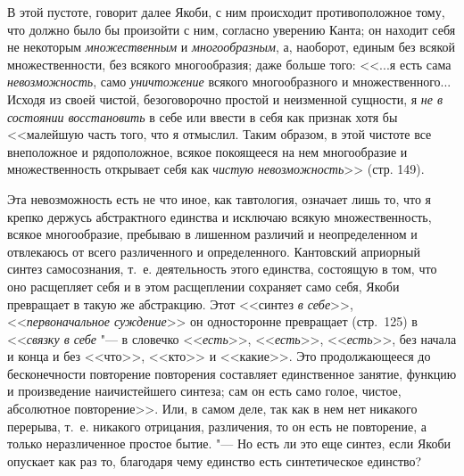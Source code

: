 В этой пустоте, говорит далее Якоби, с ним происходит противоположное тому,
что должно было бы произойти с ним, согласно уверению Канта; он находит
себя не некоторым {\em множественным} и
{\em многообразным}, а, наоборот, единым без всякой
множественности, без всякого многообразия; даже больше того: <<...я есть
сама {\em невозможность}, само
{\em уничтожение} всякого многообразного и
множественного... Исходя из своей чистой, безоговорочно простой и
неизменной сущности, я {\em не в состоянии
восстановить} в себе или ввести в себя как признак хотя бы <<малейшую часть
того, что я отмыслил. Таким образом, в этой чистоте все внеположное и
рядоположное, всякое покоящееся на нем многообразие и множественность
открывает себя как {\em чистую невозможность}>> (стр.
149).

Эта невозможность есть не что иное, как тавтология, означает лишь то, что я
крепко держусь абстрактного единства и исключаю всякую множественность,
всякое многообразие, пребываю в лишенном различий и неопределенном и
отвлекаюсь от всего различенного и определенного. Кантовский априорный
синтез самосознания, т.~е. деятельность этого единства, состоящую в том,
что оно расщепляет себя и в этом расщеплении сохраняет само себя, Якоби
превращает в такую же абстракцию. Этот <<синтез {\em в
себе}>>, <<{\em первоначальное суждение}>> он односторонне
превращает (стр.~125) в
<<{\em связку в себе} "--- в словечко
<<{\em есть}>>, <<{\em есть}>>,
<<{\em есть}>>, без начала и конца и без <<что>>, <<кто>> и
<<какие>>. Это продолжающееся до бесконечности повторение повторения
составляет единственное занятие, функцию и произведение наичистейшего
синтеза; сам он есть само голое, чистое, абсолютное повторение>>. Или, в
самом деле, так как в нем нет никакого перерыва, т.~е. никакого отрицания,
различения, то он есть не повторение, а только неразличенное простое бытие.
"--- Но есть ли это еще синтез, если Якоби опускает как раз то, благодаря чему
единство есть синтетическое единство?

